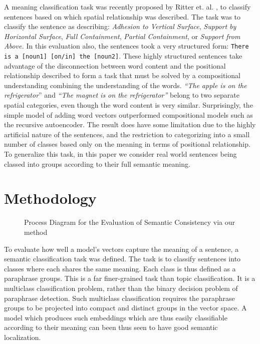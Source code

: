 \documentclass[]{book}
\begin{document}
A meaning classification task was recently proposed by Ritter et.
al. \cite{RitterPosition}, to classify sentences based on which spatial
relationship was described. The task was to classify the sentence
as describing: \emph{Adhesion to Vertical Surface},\emph{ Support
by Horizontal Surface},\emph{ Full Containment},\emph{ Partial Containment},\emph{
}or\emph{ Support from Above.} In this evaluation also, the sentences
took a very structured form: \texttt{There is a {[}noun1{]} {[}on/in{]}
the {[}noun2{]}}. These highly structured sentences take advantage
of the disconnection between word content and the positional relationship
described to form a task that must be solved by a compositional understanding
combining the understanding of the words. \emph{``The apple is on
the refrigerator}'' and \emph{``The magnet is on the refrigerator''}
belong to two separate spatial categories, even though the word content
is very similar. Surprisingly, the simple model of adding word vectors
outperformed compositional models such as the recursive autoencoder.
The result does have some limitation due to the highly artificial
nature of the sentences, and the restriction to categorizing into
a small number of classes based only on the meaning in terms of positional
relationship. To generalize this task, in this paper we consider real
world sentences being classed into groups according to their full
semantic meaning.


\section{Methodology}

\label{sec:Methodology}

\begin{figure}
\resizebox{\textwidth}{!}{}

\caption{\label{fig:Process-Diagram} Process Diagram for the Evaluation of Semantic Consistency via our method}
\end{figure}


To evaluate how well a model's vectors capture the meaning of a sentence,
a semantic classification task was defined. The task is to classify
sentences into classes where each shares the same meaning. Each class
is thus defined as a paraphrase groups. This is a far finer-grained
task than topic classification. It is a multiclass classification
problem, rather than the binary decision problem of paraphrase detection.
Such multiclass classification requires the paraphrase groups to be
projected into compact and distinct groups in the vector space. A
model which produces such embeddings which are thus easily classifiable
according to their meaning can been thus seen to have good semantic
localization. 
\end{document}
